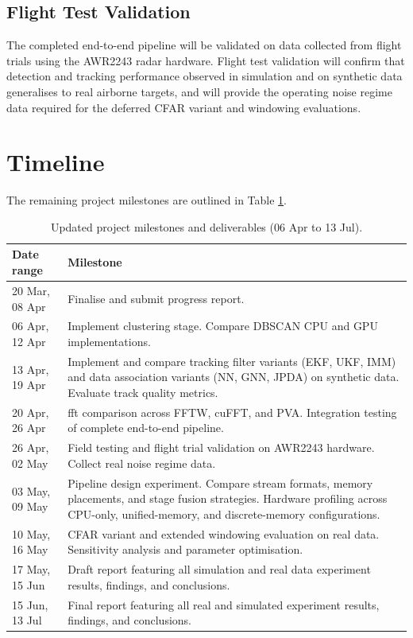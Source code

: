 \subsection{Flight Test Validation}
The completed end-to-end pipeline will be validated on data collected from flight trials using the AWR2243 radar hardware. Flight test validation will confirm that detection and tracking performance observed in simulation and on synthetic data generalises to real airborne targets, and will provide the operating noise regime data required for the deferred CFAR variant and windowing evaluations.

\section{Timeline}
The remaining project milestones are outlined in Table \ref{tab:milestones-updated}.

\begin{table}[H]
    \centering
    \caption{Updated project milestones and deliverables (06 Apr to 13 Jul).}
    \begin{tabular}{p{}|p{}}
        \hline
        \textbf{Date range} & \textbf{Milestone} \\
        \hline
        20 Mar, 08 Apr & Finalise and submit progress report. \\
        06 Apr, 12 Apr & Implement clustering stage. Compare DBSCAN CPU and GPU implementations. \\
        13 Apr, 19 Apr & Implement and compare tracking filter variants (EKF, UKF, IMM) and data association variants (NN, GNN, JPDA) on synthetic data. Evaluate track quality metrics. \\
        20 Apr, 26 Apr & \gls{fft} comparison across FFTW, cuFFT, and PVA. Integration testing of complete end-to-end pipeline. \\
        26 Apr, 02 May & Field testing and flight trial validation on AWR2243 hardware. Collect real noise regime data. \\
        03 May, 09 May & Pipeline design experiment. Compare stream formats, memory placements, and stage fusion strategies. Hardware profiling across CPU-only, unified-memory, and discrete-memory configurations. \\
        10 May, 16 May & CFAR variant and extended windowing evaluation on real data. Sensitivity analysis and parameter optimisation. \\
        17 May, 15 Jun & Draft report featuring all simulation and real data experiment results, findings, and conclusions. \\
        15 Jun, 13 Jul & Final report featuring all real and simulated experiment results, findings, and conclusions. \\
    \end{tabular}
    \label{tab:milestones-updated}
\end{table}

